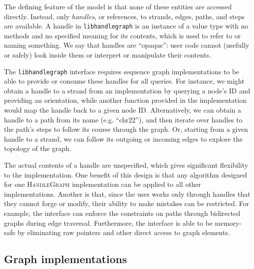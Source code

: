 \documentclass{bioinfo}
\begin{document}
\begin{methods}
The defining feature of the model is that none of these entities are accessed directly.
Instead, only \emph{handles}, or references, to strands, edges, paths, and steps are available.
A handle in \texttt{libhandlegraph} is an instance of a value type with no methods and no specified meaning for its contents, which is used to refer to or naming something.
We say that handles are ``opaque'': user code cannot (usefully or safely) look inside them or interpret or manipulate their contents.

The \texttt{libhandlegraph} interface requires sequence graph implementations to be able to provide or consume these handles for all queries.
For instance, we might obtain a handle to a strand from an implementation by querying a node's ID and providing an orientation, while another function provided in the implementation would map the handle back to a given node ID.
Alternatively, we can obtain a handle to a path from its name (e.g. ``chr22''), and then iterate over handles to the path's steps to follow its course through the graph.
Or, starting from a given handle to a strand, we can follow its outgoing or incoming edges to explore the topology of the graph.


The actual contents of a handle are unspecified, which gives significant flexibility to the implementation.
One benefit of this design is that any algorithm designed for one \textsc{HandleGraph} implementation can be applied to all other implementations.
Another is that, since the user works only through handles that they cannot forge or modify, their ability to make mistakes can be restricted.
For example, the interface can enforce the constraints on paths through bidirected graphs during edge traversal.
Furthermore, the interface is able to be memory-safe by eliminating raw pointers and other direct access to graph elements.



\subsection{Graph implementations}


\end{methods}
\end{document}
